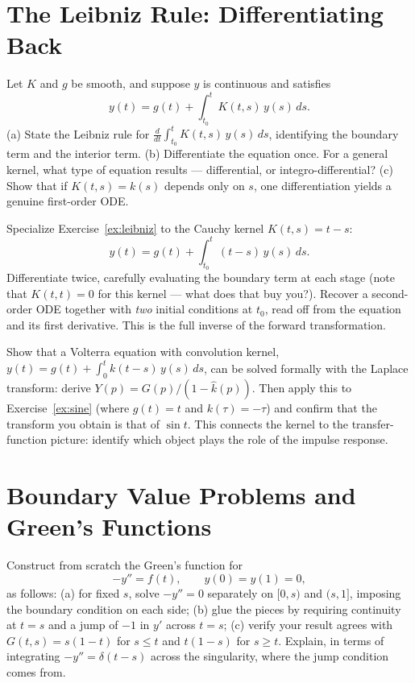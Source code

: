 \documentclass{essay}
\begin{document}
\section{The Leibniz Rule: Differentiating Back}

\begin{exercise}\label{ex:leibniz}
Let $K$ and $g$ be smooth, and suppose $y$ is continuous and satisfies
\[
y(t) = g(t) + \int_{t_0}^{t} K(t, s)\, y(s)\, ds.
\]
(a) State the Leibniz rule for $\frac{d}{dt}\int_{t_0}^{t} K(t,s)\,y(s)\,ds$, identifying the boundary term and the interior term. (b) Differentiate the equation once. For a general kernel, what type of equation results --- differential, or integro-differential? (c) Show that if $K(t,s) = k(s)$ depends only on $s$, one differentiation yields a genuine first-order ODE.
\end{exercise}

\begin{exercise}\label{ex:twoderivs}
Specialize Exercise~\ref{ex:leibniz} to the Cauchy kernel $K(t,s) = t - s$:
\[
y(t) = g(t) + \int_{t_0}^{t} (t - s)\, y(s)\, ds.
\]
Differentiate twice, carefully evaluating the boundary term at each stage (note that $K(t,t) = 0$ for this kernel --- what does that buy you?). Recover a second-order ODE together with \emph{two} initial conditions at $t_0$, read off from the equation and its first derivative. This is the full inverse of the forward transformation.
\end{exercise}

\begin{exercise}\label{ex:convolution}
Show that a Volterra equation with convolution kernel, $y(t) = g(t) + \int_0^t k(t-s)\,y(s)\,ds$, can be solved formally with the Laplace transform: derive $Y(p) = G(p)/(1 - \widehat{k}(p))$. Then apply this to Exercise~\ref{ex:sine} (where $g(t) = t$ and $k(\tau) = -\tau$) and confirm that the transform you obtain is that of $\sin t$. This connects the kernel to the transfer-function picture: identify which object plays the role of the impulse response.
\end{exercise}

\section{Boundary Value Problems and Green's Functions}

\begin{exercise}\label{ex:green-construct}
Construct from scratch the Green's function for
\[
-y'' = f(t), \qquad y(0) = y(1) = 0,
\]
as follows: (a) for fixed $s$, solve $-y'' = 0$ separately on $[0,s)$ and $(s,1]$, imposing the boundary condition on each side; (b) glue the pieces by requiring continuity at $t = s$ and a jump of $-1$ in $y'$ across $t = s$; (c) verify your result agrees with $G(t,s) = s(1-t)$ for $s \le t$ and $t(1-s)$ for $s \ge t$. Explain, in terms of integrating $-y'' = \delta(t - s)$ across the singularity, where the jump condition comes from.
\end{exercise}
\end{document}
